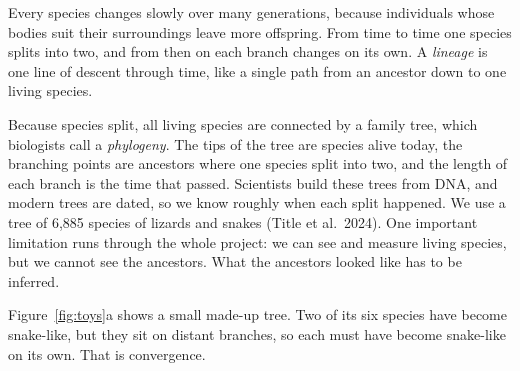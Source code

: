 \documentclass[11pt]{article}
\begin{document}
Every species changes slowly over many generations, because individuals whose bodies suit their surroundings leave more offspring. From time to time one species splits into two, and from then on each branch changes on its own. A \emph{lineage} is one line of descent through time, like a single path from an ancestor down to one living species.

Because species split, all living species are connected by a family tree, which biologists call a \emph{phylogeny}. The tips of the tree are species alive today, the branching points are ancestors where one species split into two, and the length of each branch is the time that passed. Scientists build these trees from DNA, and modern trees are dated, so we know roughly when each split happened. We use a tree of 6,885 species of lizards and snakes (Title et al.\ 2024). One important limitation runs through the whole project: we can see and measure living species, but we cannot see the ancestors. What the ancestors looked like has to be inferred.

Figure~\ref{fig:toys}a shows a small made-up tree. Two of its six species have become snake-like, but they sit on distant branches, so each must have become snake-like on its own. That is convergence.
\end{document}
